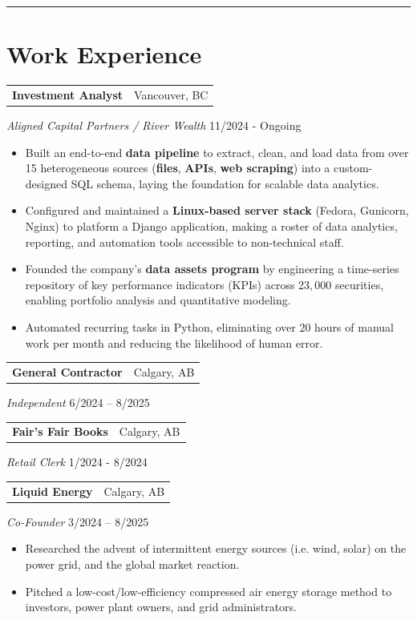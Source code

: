 \documentclass[a4paper,10pt]{article}
\makeatletter
\newcommand{\work}[5]{
	{
		\vspace{1.5mm}
		\noindent
		\begin{tabular*}{\textwidth}{@{\extracolsep{\fill}} l r}
			\textbf{#1} & #2 \\
		\end{tabular*}
		\vspace{-5mm}
		\textit{#3} \hfill #4 \\
		\begin{itemize}
			\setlength{\itemsep}{-1mm}
			\setlength{\topsep}{0mm}
			\setlength{\parsep}{0mm}
			#5
		\end{itemize}
	}
}
\newcommand{\workbrief}[4]{
	{
		\vspace{1.5mm}
		\noindent
		\begin{tabular*}{\textwidth}{@{\extracolsep{\fill}} l r}
			\textbf{#1} & #2 \\
		\end{tabular*}
		\vspace{-5mm}
		\textit{#3} \hfill #4 \\
		\vspace{1.8mm}
	}
}
\makeatother
\begin{document}
\noindent\rule{\textwidth}{0.4pt}
\section*{Work Experience}
	
	\work
	{Investment Analyst}
	{Vancouver, BC}
	{Aligned Capital Partners / River Wealth}
	{11/2024 - Ongoing}
	{
		
		\item Built an end-to-end \textbf{data pipeline} to extract, clean, and load data from over 15 heterogeneous sources (\textbf{files}, \textbf{APIs}, \textbf{web scraping}) into a custom-designed SQL schema, laying the foundation for scalable data analytics.
		
		\item Configured and maintained a \textbf{Linux-based server stack} (Fedora, Gunicorn, Nginx) to platform a Django application, making a roster of data analytics, reporting, and automation tools accessible to non-technical staff.
		
		\item Founded the company's \textbf{data assets program} by engineering a time-series repository of key performance indicators (KPIs) across 23$,$000 securities, enabling portfolio analysis and quantitative modeling.
		
		\item Automated recurring tasks in Python, eliminating over 20 hours of manual work per month and reducing the likelihood of human error.
	}

	\workbrief
	{General Contractor}
	{Calgary, AB}
	{Independent}
	{6/2024 – 8/2025}
	
	\workbrief
	{Fair's Fair Books}
	{Calgary, AB}
	{Retail Clerk}
	{1/2024 - 8/2024}
	
	
	\work
	{Liquid Energy}
	{Calgary, AB}
	{Co-Founder}
	{3/2024 – 8/2025}
	{
		\item Researched the advent of intermittent energy sources (i.e. wind, solar) on the power grid, and the global market reaction.
		\item Pitched a low-cost/low-efficiency compressed air energy storage method to investors, power plant owners, and grid administrators.
	}
	
\end{document}
